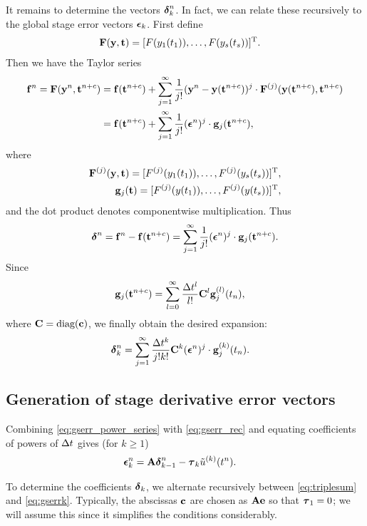 It remains to determine the vectors $\boldsymbol{\delta}^n_k$. In fact, 
we can relate these recursively to the global stage error vectors $\boldsymbol{\epsilon}_k$.  First define
\begin{align*}
\mathbf{F}(\mathbf{y},\mathbf{t}) & = [F(y_1(t_1)),\dots,F(y_s(t_s))]^\mathrm{T}.
\end{align*}
Then we have the Taylor series
\begin{align*}
    \mathbf{f}^n =  \mathbf{F}(\mathbf{y}^n,\mathbf{t}^{n+c}) & = \mathbf{f}(\mathbf{t}^{n+c}) + \sum_{j=1}^\infty \frac{1}{j!} (\mathbf{y}^n-\mathbf{y}(\mathbf{t}^{n+c}))^j \cdot
    \mathbf{F}^{(j)}(\mathbf{y}(\mathbf{t}^{n+c}),\mathbf{t}^{n+c}) \\
    & = \mathbf{f}(\mathbf{t}^{n+c}) + \sum_{j=1}^\infty \frac{1}{j!} (\boldsymbol{\epsilon}^n)^j \cdot \mathbf{g}_j(\mathbf{t}^{n+c}),
\end{align*}
where 
\begin{align*}
\mathbf{F}^{(j)}(\mathbf{y},\mathbf{t}) = [F^{(j)}(y_1(t_1)),\dots,F^{(j)}(y_s(t_s))]^\mathrm{T}, \\
\mathbf{g}_j(\mathbf{t}) = [F^{(j)}(y(t_1)),\dots,F^{(j)}(y(t_s))]^\mathrm{T},
\end{align*}
and the dot product denotes componentwise multiplication. Thus
\begin{align}
  \boldsymbol{\delta}^n = \mathbf{f}^n - \mathbf{f}(\mathbf{t}^{n+c}) = \sum_{j=1}^\infty \frac{1}{j!} (\boldsymbol{\epsilon}^n)^j \cdot
          \mathbf{g}_j(\mathbf{t}^{n+c}).
\end{align}
Since
\begin{align}
    \mathbf{g}_j(\mathbf{t}^{n+c}) & = \sum_{l=0}^\infty \frac{\Delta t^l}{l!} \mathbf{C}^l \mathbf{g}_j^{(l)}(t_{n}),
\end{align}
where $\mathbf{C}=\textup{diag}(\mathbf{c})$, we finally obtain the desired expansion:
\begin{align} \label{eq:triplesum}
\boldsymbol{\delta}^n_k & = \sum_{j=1}^\infty \frac{\Delta t^k}{j!k!} \mathbf{C}^k (\boldsymbol{\epsilon}^n)^j \cdot \mathbf{g}_j^{(k)}(t_{n}).
\end{align}

\subsection{Generation of stage derivative error vectors\label{recursion}}
Combining \eqref{eq:gserr_power_series} with \eqref{eq:gserr_rec} and equating
coefficients of powers of $\Delta t$ gives (for $k\ge 1$)
\begin{align} \label{eq:gserrk}
\boldsymbol{\epsilon}^n_k & = \mathbf{A} \boldsymbol{\delta}^n_{k-1} - \boldsymbol{\tau}_k \tilde{u}^{(k)}(t^n).
\end{align}

To determine the coefficients $\boldsymbol{\delta}_k$, we alternate recursively 
between \eqref{eq:triplesum} and \eqref{eq:gserrk}.
Typically, the abscissas $\mathbf{c}$ are chosen as $\mathbf{A}\mathbf{e}$ so that $\boldsymbol{\tau}_1=0$; 
we will assume this since it simplifies the conditions considerably.

